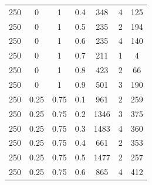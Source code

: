 \documentclass[a4paper,oneside,14pt]{extreport}
\begin{document}
\begin{table}[h]
\begin{center}
\begin{tabular}{|c|c|c|c|c|c|c|}
		250 & 0 & 1 & 0.4 & 348 & 4 & 125 \\
		250 & 0 & 1 & 0.5 & 235 & 2 & 194 \\
		250 & 0 & 1 & 0.6 & 235 & 4 & 140 \\
		250 & 0 & 1 & 0.7 & 211 & 1 & 4 \\
		250 & 0 & 1 & 0.8 & 423 & 2 & 66 \\
		250 & 0 & 1 & 0.9 & 501 & 3 & 190 \\
		250 & 0.25 & 0.75 & 0.1 & 961 & 2 & 259 \\
		250 & 0.25 & 0.75 & 0.2 & 1346 & 3 & 375 \\
		250 & 0.25 & 0.75 & 0.3 & 1483 & 4 & 360 \\
		250 & 0.25 & 0.75 & 0.4 & 661 & 2 & 353 \\
		250 & 0.25 & 0.75 & 0.5 & 1477 & 2 & 257 \\
		250 & 0.25 & 0.75 & 0.6 & 865 & 4 & 412 \\
		\hline
	\end{tabular}
\end{center}
\end{table}
\end{document}
